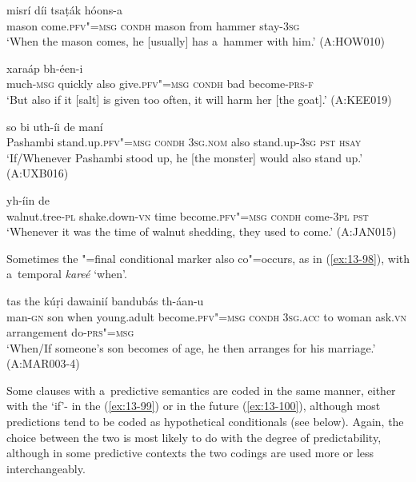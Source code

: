 \begin{exe}
\ex
\label{ex:13-94}
 misrí díi tsaṭák hóons-a \\
mason come.\textsc{pfv"=msg} \textsc{condh} mason from hammer stay-\textsc{3sg}  \\
\glt `When the mason comes, he [usually] has a~hammer with him.' (A:HOW010)

\ex
\label{ex:13-95}
 xaraáp  bh-éen-i \\
much-\textsc{msg} quickly also give.\textsc{pfv"=msg} \textsc{condh} bad  become-\textsc{prs-f}   \\
\glt `But also if it [salt] is given too often, it will harm her [the goat].' (A:KEE019)

\ex
\label{ex:13-96}
 so bi  uth-íi de maní \\
Pashambi stand.up.\textsc{pfv"=msg} \textsc{condh} \textsc{3sg.nom} also stand.up-\textsc{3sg} \textsc{pst} \textsc{hsay}  \\
\glt `If/Whenever Pashambi stood up, he [the monster] would also stand up.' (A:UXB016)

\ex
\label{ex:13-97}
\gll [ac̣húuṛi-m ṭhak"=ainií waxt bhíl-u seentá]  yh-íin de \\
walnut.tree-\textsc{pl} shake.down-\textsc{vn} time become.\textsc{pfv"=msg} \textsc{condh} come-\textsc{3pl} \textsc{ pst}    \\
\glt `Whenever it was the time of walnut shedding, they used to come.' (A:JAN015) 
\end{exe}

Sometimes the "=final conditional marker also co"=occurs, as in (\ref{ex:13-98}), with a~temporal  \textit{kareé} `when'. 

\begin{exe}
\ex
\label{ex:13-98}
  tas the kúṛi dawainií
bandubás  th-áan-u \\
man-\textsc{gn} son when young.adult become.\textsc{pfv"=msg} \textsc{condh} \textsc{3sg.acc} to woman ask.\textsc{vn} arrangement do-\textsc{prs"=msg}  \\
\glt `When/If someone's son becomes of age, he then arranges for his marriage.' (A:MAR003-4) 
\end{exe}

Some clauses with a~predictive semantics are coded in the same manner, either with the `if'- in the  (\ref{ex:13-99}) or in the future (\ref{ex:13-100}), although most predictions tend to be coded as hypothetical conditionals (see below). Again, the choice between the two is most likely to do with the degree of predictability, although in some predictive contexts the two codings are used more or less interchangeably.

